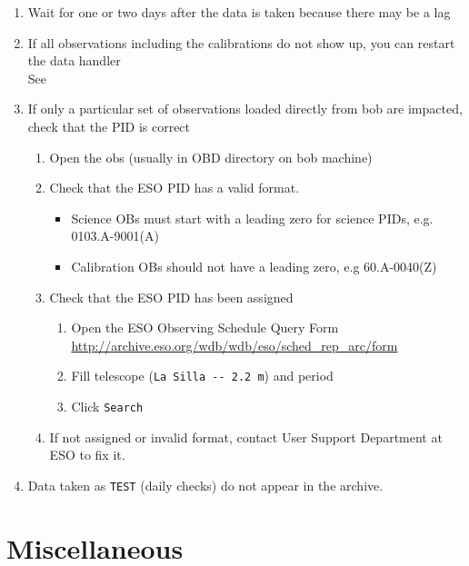 \documentclass[11pt,fleqn,a4paper]{book}
\begin{document}
\begin{enumerate}
   \item Wait for one or two days after the data is taken because there may be a lag
   \item If all observations including the calibrations do not show up,
         you can restart the data handler\\
         See 
   \item If only a particular set of observations loaded directly from bob
         are impacted, check that the PID is correct
         \begin{enumerate}
           \item Open the \glspl{ob} (usually in OBD directory on bob machine)
           \item Check that the ESO PID has a valid format.
           \begin{itemize}
               \item Science OBs must start with a leading
                 zero for science PIDs, e.g. 0103.A-9001(A)
               \item Calibration OBs should not have a leading zero, e.g 60.A-0040(Z) 
           \end{itemize}
           \item Check that the ESO PID has been assigned 
              \begin{enumerate}
                \item Open the ESO Observing Schedule Query Form\\
                      \url{http://archive.eso.org/wdb/wdb/eso/sched\_rep\_arc/form}
                \item Fill telescope (\texttt{La Silla -{}- 2.2 m}) and period 
                \item Click \texttt{Search}
              \end{enumerate}
           \item If not assigned or invalid format, contact User Support Department at ESO to fix it.
     \end{enumerate}
   \item Data taken as \texttt{TEST} (daily checks) do not appear in the archive.
\end{enumerate}

\section{Miscellaneous}
\end{document}
